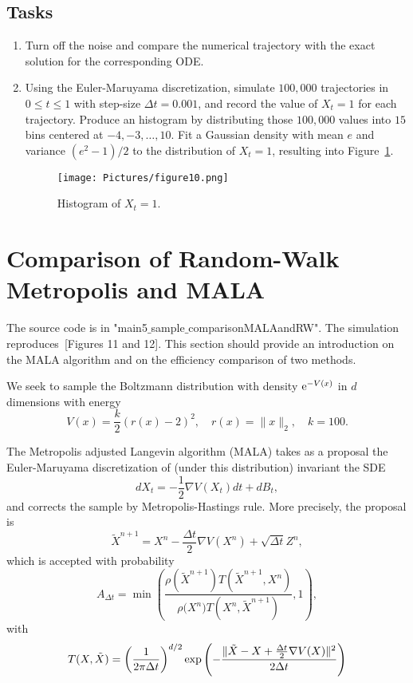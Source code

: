 \documentclass{scrartcl}
\begin{document}
\subsection{Tasks}
\begin{enumerate}
\item Turn off the noise and compare the numerical trajectory with the exact solution for the corresponding ODE. 
\item Using the Euler-Maruyama discretization, simulate $100, 000$ trajectories in $0 \leq t \leq 1$ with step-size $\Delta t = 0.001$, and record the value of $X_t=1$ for each trajectory. Produce an histogram by distributing those $100,000$ values into $15$ bins centered at $-4, -3, \ldots , 10$. Fit a Gaussian density with mean $e$ and variance $(e^2 -1)/2$ to the distribution of $X_t=1$, resulting into Figure~\ref{fig3}.
\begin{figure}[h]
\begin{center}
\texttt{[image: Pictures/figure10.png]}
\end{center}
\caption{Histogram of $X_t=1$.}
\label{fig3}
\end{figure}
\end{enumerate}


\section{Comparison of Random-Walk Metropolis and MALA}

The source code is in "main5$\_$sample$\_$comparisonMALAandRW". The simulation reproduces~\cite{sanz2014markov}[Figures 11 and 12].  This section should provide an introduction on the MALA algorithm and on the efficiency comparison of two methods.

We seek to sample the Boltzmann distribution with density ${\rm e}^{-V(x)}$ in $d$ dimensions with energy
\[
V(x) = \frac{k}{2}(r(x) - 2)^2, \quad r(x) = \| x\|_2, \quad k=100.
\]

The Metropolis adjusted Langevin algorithm (MALA) takes as a proposal the Euler-Maruyama discretization of (under this distribution) invariant the SDE
\[
dX_t =-\frac{1}{2}\nabla V (X_t)dt+ dB_t, 
\]
and corrects the sample by Metropolis-Hastings rule. More precisely,  the proposal is 
\[
\tilde{X}^{n+1} = X^n -  \frac{\Delta t}{2} \nabla V(X^n)  + \sqrt{\Delta t} Z^n,
\]
which is accepted with probability
\[
A_{\Delta t} = \min \left( \frac{\rho(\tilde{X}^{n+1}) T(\tilde{X}^{n+1}, X^n)}{{\rho({X}^{n}}) T(X^n, \tilde{X}^{n+1})} , 1 \right), 
\]
with
\[
T(X, \tilde{X}) = \left(\frac{1}{2\pi \Delta t}\right)^{d/2}{\rm exp}\left(- \frac{\| \tilde{X} - X + \frac{\Delta t}{2}\nabla V(X)  \|^2}{2\Delta t}\right)
\]
\end{document}
